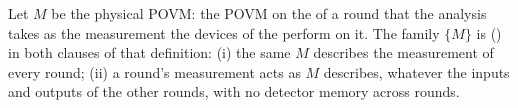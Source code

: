 \begin{assumption}\label{ass:round}
Let $M$ be the physical POVM: the POVM on the  of a
round that the analysis takes as the measurement the devices of the
 perform on it.
The family $\{M\}$ is 
() in both clauses of that
definition:
(i) the same $M$ describes the measurement of every round;
(ii) a round's measurement acts as $M$ describes, whatever the inputs and
outputs of the other rounds, with no detector memory across rounds.
\end{assumption}
